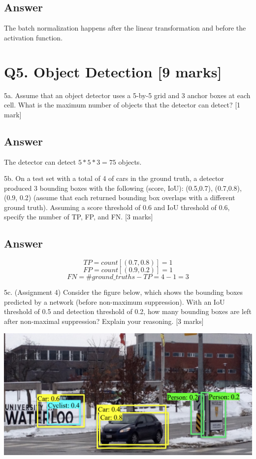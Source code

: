 \documentclass[
	12pt, %
]{fphw}
\begin{document}
\subsection*{Answer}
The batch normalization happens after the linear transformation and before the activation function.
\section*{Q5. Object Detection [9 marks] }
\begin{problem}
5a. Assume that an object detector uses a 5-by-5 grid and 3 anchor boxes at each cell.
What is the maximum number of objects that the detector can detect? [1 mark]
\end{problem}
\subsection*{Answer}
The detector can detect $5*5*3 = 75$ objects.
\begin{problem}
5b. On a test set with a total of 4 of cars in the ground truth, a detector produced 3
bounding boxes with the following (score, IoU): (0.5,0.7), (0.7,0.8), (0.9, 0.2) (assume
that each returned bounding box overlaps with a different ground truth). Assuming a
score threshold of 0.6 and IoU threshold of 0.6, specify the number of TP, FP, and FN. [3
		marks]
\end{problem}
\subsection*{Answer}
\begin{equation}
	TP = count[(0.7,0.8)] = 1
\end{equation}
\begin{equation}
	FP = count[(0.9,0.2)] = 1
\end{equation}
\begin{equation}
	FN = \#ground\_truths - TP = 4-1 = 3
\end{equation}
\begin{problem}
5c. (Assignment 4) Consider the figure below, which shows the bounding boxes
predicted by a network (before non-maximum suppression). With an IoU threshold of 0.5
and detection threshold of 0.2, how many bounding boxes are left after non-maximal
suppression? Explain your reasoning. [3 marks]
\begin{center}
	\includegraphics[width=0.75\columnwidth, page=1]{5c.png} %
\end{center}
\end{problem}
\end{document}
